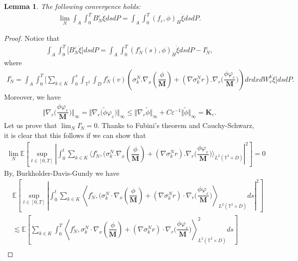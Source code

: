 \documentclass[a4paper,12pt, reqno]{amsart}
\newtheorem{lemma}[theorem]{Lemma}
\newcommand{\T}{\mathbb{T}}
\newcommand{\EE}[1]{\mathbb{E}\left[#1\right]}
\begin{document}
	\begin{lemma}\label{Lemma-stoch-cv} The   following  convergence holds:  
	    \begin{align}\label{limit-cv-*}
	        	\lim_N	\int_A\int_0^TB_N^\varepsilon \dot\xi dsdP=\int_A\int_0^T 
                (f_\varepsilon, \phi)_H \dot \xi  dsdP.
	    \end{align}
	\end{lemma}
\begin{proof} Notice that
\begin{align}
   \label{cv-3-stoch} \int_A\int_0^T\bigl[ B_N^\varepsilon\dot\xi \bigr]dsdP =\int_A\int_0^T(f_N^\varepsilon(s),\phi)_H \dot\xi dsdP-I_N^\varepsilon,
\end{align}
where 
\begin{align}\label{Martingale-lim}
I_N^\varepsilon=\int_A\int_0^T\bigl[ \sum_{k\in K}\int_0^s\int_{\mathbb{T}^2}\int_{D}f_N^\varepsilon(v)( \sigma_k^N.\nabla_x(\dfrac{\phi}{\mathbf{M}}) +(\nabla \sigma_k^Nr).\nabla_r\big(\dfrac{\phi \varphi_\varepsilon}{\mathbf{M}}\big)) drdxdW^k_v\dot \xi\bigr]dsdP.
\end{align}
Moreover, we have
\begin{align}\label{bound-weight-cut}
    \Vert \nabla_r\big(\dfrac{\phi \varphi_\varepsilon}{\mathbf{M}}\big)\Vert_\infty= \Vert \nabla_r\big(\widetilde{\phi} \varphi_\varepsilon\big)\Vert_\infty \leq  \Vert \nabla_r\widetilde{\phi}\Vert_\infty+C{\varepsilon}^{-1}\Vert \widetilde{\phi}\Vert_\infty =\mathbf{K}_\varepsilon.
\end{align}
Let us prove that $\displaystyle\lim_N I_N^\varepsilon=0.$  
Thanks to Fubini’s theorem and Cauchy-Schwarz, it is clear that this follows if we can show that 
\begin{align}
    \lim_N \EE{\sup_{t\in [0, T]}\left|\int _0^t \sum_{k\in K}\langle f_N^\varepsilon,( \sigma_k^N.\nabla_x(\dfrac{\phi}{\mathbf{M}}) +(\nabla \sigma_k^Nr).\nabla_r\big(\dfrac{\phi \varphi_\varepsilon}{\mathbf{M}}\big)\rangle_{L^2(\T^2\times D)}\right|^2} =0
\end{align}
By, Burkholder-Davis-Gundy we have 
\begin{align*}
    &\EE{\sup_{t\in [0, T]} \left|\int _0^t \sum_{k\in K}\left\langle f_N^\varepsilon,( \sigma_k^N\cdot\nabla_x(\dfrac{\phi}{\mathbf{M}}) +(\nabla \sigma_k^Nr)\cdot\nabla_r\big(\dfrac{\phi \varphi_\varepsilon}{\mathbf{M}}\big)\right\rangle_{L^2(\T^2\times D)}ds\right|^2} \\ 
    &\lesssim \EE{\sum_{k\in K}\int _0^T \left\langle f_N^\varepsilon, \sigma_k^N\cdot \nabla_x(\dfrac{\phi}{\mathbf{M}}) +(\nabla \sigma_k^Nr)\cdot \nabla_r\big(\dfrac{\phi \varphi_\varepsilon}{\mathbf{M}}\big)\right\rangle_{L^2(\T^2\times D)}^2 ds}\\

\end{align*}
\end{proof}
\end{document}
